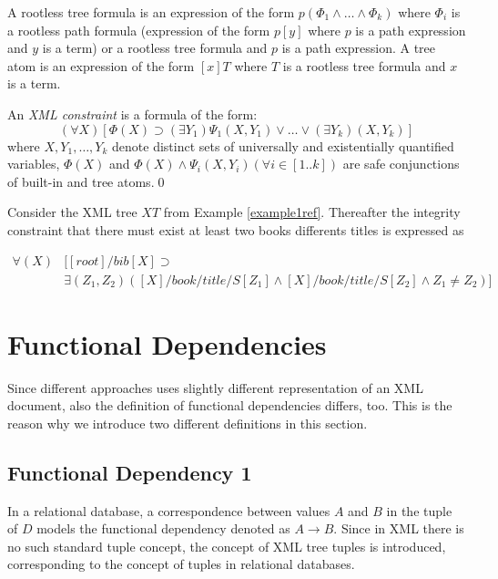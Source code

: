A rootless tree formula is an expression of the form $p(\Phi_1 \land \dots \land \Phi_k)$ where $\Phi_i$ is a rootless path formula (expression of the form $p[y]$ where $p$ is a path expression and $y$ is a term) or a rootless tree formula and $p$ is a path expression. A tree atom is an expression of the form $[x]T$ where $T$ is a rootless tree formula and $x$ is a term.

\begin{define}\label{integConstr}
An {\sl XML constraint} is a formula of the form: $$(\forall X)[\Phi(X)\supset (\exists Y_1)\Psi_1(X,Y_1) \lor \dots \lor (\exists Y_k)(X,Y_k)]$$
where $X,Y_1,\dots, Y_k$ denote distinct sets of universally and existentially quantified variables, $\Phi(X)$ and $\Phi(X) \land \Psi_i(X, Y_i) (\forall i \in [1..k])$ are safe conjunctions of built-in and tree atoms.\qed
\end{define}

\begin{example}
Consider the XML tree $XT$ from Example \ref{example1ref}. Thereafter the integrity constraint that there must exist at least two books differents titles is expressed as

\begin{align*}
\forall(X)&[[root]/bib[X] \supset\\
&\exists(Z_1, Z_2)([X]/book/title/S[Z_1] \land [X]/book/title/S[Z_2] \land Z_1 \not = Z_2)]
\end{align*}
\end{example}

\section{Functional Dependencies}

Since different approaches uses slightly different representation of an XML document, also the definition of functional dependencies differs, too. This is the reason why we introduce two different definitions in this section.

\subsection{Functional Dependency 1}

In a relational database, a correspondence between values $A$ and $B$ in the tuple of $D$ models the functional dependency denoted as $A \rightarrow B$. Since in XML there is no such standard tuple concept, the concept of XML tree tuples is introduced, corresponding to the concept of tuples in relational databases.

